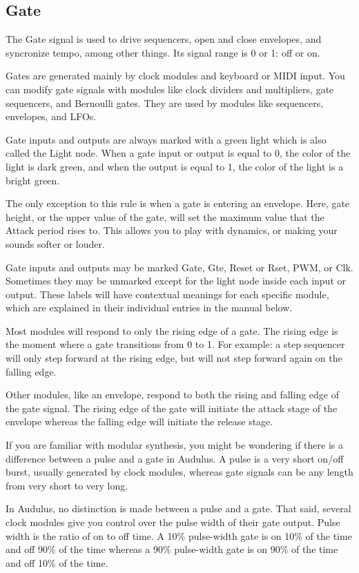 \documentclass[11pt]{book}
\begin{document}
\begin{multicols*}{2}
\subsection{Gate}

The Gate signal is used to drive sequencers, open and close envelopes, and syncronize tempo, among other things. Its signal range is 0 or 1: off or on.

Gates are generated mainly by clock modules and keyboard or MIDI input. You can modify gate signals with modules like clock dividers and multipliers, gate sequencers, and Bernoulli gates. They are used by modules like sequencers, envelopes, and LFOs.

Gate inputs and outputs are always marked with a green light which is also called the Light node. When a gate input or output is equal to 0, the color of the light is dark green, and when the output is equal to 1, the color of the light is a bright green.

The only exception to this rule is when a gate is entering an envelope. Here, gate height, or the upper value of the gate, will set the maximum value that the Attack period rises to. This allows you to play with dynamics, or making your sounds softer or louder.

Gate inputs and outputs may be marked Gate, Gte, Reset or Rset, PWM, or Clk. Sometimes they may be unmarked except for the light node inside each input or output. These labels will have contextual meanings for each specific module, which are explained in their individual entries in the manual below.

Most modules will respond to only the rising edge of a gate. The rising edge is the moment where a gate transitions from 0 to 1. For example: a step sequencer will only step forward at the rising edge, but will not step forward again on the falling edge.

Other modules, like an envelope, respond to both the rising and falling edge of the gate signal. The rising edge of the gate will initiate the attack stage of the envelope whereas the falling edge will initiate the release stage.

If you are familiar with modular synthesis, you might be wondering if there is a difference between a pulse and a gate in Audulus. A pulse is a very short on/off burst, usually generated by clock modules, whereas gate signals can be any length from very short to very long.

In Audulus, no distinction is made between a pulse and a gate. That said, several clock modules give you control over the pulse width of their gate output. Pulse width is the ratio of on to off time. A 10\% pulse-width gate is on 10\% of the time and off 90\% of the time whereas a 90\% pulse-width gate is on 90\% of the time and off 10\% of the time.


\end{multicols*}
\end{document}
